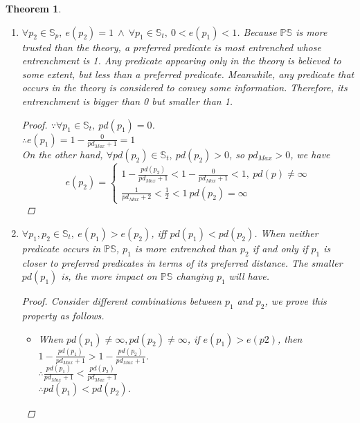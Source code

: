 \documentclass[11pt,letterpaper]{article}
\newtheorem{theorem}{Theorem}[section]
\newcommand{\ps}{\mathbb{PS}}
\begin{document}
\begin{theorem}
\begin{enumerate}
\begin{proof}
On the other hand, $\forall pd(p_2)= \infty$, we have $e(p_2) =\frac{1}{pd_{Max}+2}$.\\
$\because 0 \leq pd_{Max} $\\
$\therefore 2< pd_{Max}+2$. Thus, we have the follows.
\begin{equation}\label{equ:22}
0<e(p_2) \leq \frac{1}{2}
\end{equation}
\end{proof}
\item $\forall p_{2} \in \mathbb{S}_{p},\  e(p_{2})=1\ \wedge \  \forall p_{1}\in \mathbb{S}_{t},\  0< e(p_{1}) < 1$.\newline
\textnormal{Because $\ps$ is more trusted than the theory, a preferred predicate is most entrenched whose entrenchment is 1. Any predicate appearing only in the theory is believed to some extent, but less than a preferred predicate. Meanwhile, any predicate that occurs in the theory is considered to convey some information. Therefore, its entrenchment is bigger than 0 but smaller than 1.  }
\begin{proof}
 $\because \forall p_1 \in \mathbb{S}_t,\ pd(p_1) = 0$.\\
$\therefore e(p_1) = 1- \frac{0}{pd_{Max}+1}  = 1$\\

On the other hand, $\forall pd(p_2)\in \mathbb{S}_t,\ pd(p_2) > 0$, so $pd_{Max}> 0$, we have 
\begin{equation*}\label{equ:predEntr1}
    e(p_2) =
    \begin{cases}
    1- \frac{pd(p_2)}{pd_{Max}+1}<1- \frac{0}{pd_{Max}+1}<1,\  pd(p) \neq \infty\\
    \frac{1}{pd_{Max}+2}<\frac{1}{2}<1\ pd(p_2) = \infty
    \end{cases}
\end{equation*} 
\end{proof}

\item $\forall p_{1},p_{2}  \in \mathbb{S}_{t},\ e(p_{1}) > e(p_{2})$, iff $pd(p_{1}) < pd(p_{2})$.\newline
\textnormal{When neither predicate occurs in $\ps$, $p_{1}$  is more entrenched than $p_{2}$  if and only if $p_{1}$ is closer to preferred predicates in terms of its preferred distance. The smaller $pd(p_{1})$ is, the more impact on $\ps$ changing  $p_{1}$ will have. }
\begin{proof}
Consider different combinations between $p_1$ and $p_2$, we prove this property as follows.
\begin{itemize}
    \item  When $pd(p_1)\neq \infty, pd(p_2)\neq \infty$, if $e(p_1)>e(p2)$, then $1- \frac{pd(p_1)}{pd_{Max}+1}>1- \frac{pd(p_2)}{pd_{Max}+1}$.\\
 $\therefore \frac{pd(p_1)}{pd_{Max}+1}< \frac{pd(p_2)}{pd_{Max}+1}$\\
 $\therefore pd(p_1) < pd(p_2)$.
 

\end{itemize}
\end{proof}
\end{enumerate}
\end{theorem}
\end{document}
